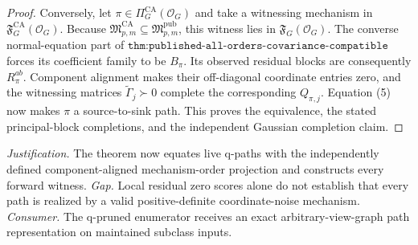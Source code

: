 \documentclass{article}
\begin{document}
\begin{proof}
Conversely, let \(\pi\in\Pi_G^{\mathrm{CA}}(\mathcal O_G)\) and take a witnessing mechanism in \(\mathfrak F_G^{\mathrm{CA}}(\mathcal O_G)\).  Because \(\mathfrak M_{p,m}^{\mathrm{CA}}\subseteq\mathfrak M_{p,m}^{\mathrm{pub}}\), this witness lies in \(\mathfrak F_G(\mathcal O_G)\).  The converse normal-equation part of \(\texttt{thm:published-all-orders-covariance-compatible}\) forces its coefficient family to be \(B_\pi\).  Its observed residual blocks are consequently \(R_\pi^{ab}\).  Component alignment makes their off-diagonal coordinate entries zero, and the witnessing matrices \(\widetilde\Gamma_j\succ0\) complete the corresponding \(Q_{\pi,j}\).  Equation (5) now makes \(\pi\) a source-to-sink path.  This proves the equivalence, the stated principal-block completions, and the independent Gaussian completion claim.
\end{proof}
\par\smallskip\noindent \textit{Justification.} The theorem now equates live q-paths with the independently defined component-aligned mechanism-order projection and constructs every forward witness. \textit{Gap.} Local residual zero scores alone do not establish that every path is realized by a valid positive-definite coordinate-noise mechanism. \textit{Consumer.} The q-pruned enumerator receives an exact arbitrary-view-graph path representation on maintained subclass inputs.
\end{document}
